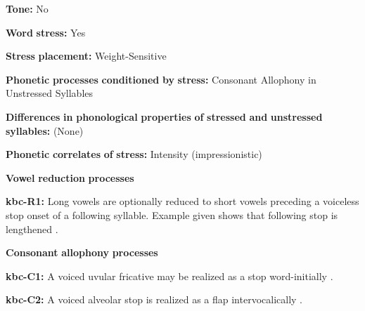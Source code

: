 \begin{styleBody}
\textbf{Tone:} No
\end{styleBody}

\begin{styleBody}
\textbf{Word} \textbf{stress:} Yes
\end{styleBody}

\begin{styleBody}
\textbf{Stress} \textbf{placement:} Weight-Sensitive
\end{styleBody}

\begin{styleBody}
\textbf{Phonetic} \textbf{processes} \textbf{conditioned} \textbf{by} \textbf{stress:} Consonant Allophony in Unstressed Syllables
\end{styleBody}

\begin{styleBody}
\textbf{Differences} \textbf{in} \textbf{phonological} \textbf{properties} \textbf{of} \textbf{stressed} \textbf{and} \textbf{unstressed} \textbf{syllables:} (None)
\end{styleBody}

\begin{styleBody}
\textbf{Phonetic} \textbf{correlates} \textbf{of} \textbf{stress:} Intensity (impressionistic)
\end{styleBody}

\begin{styleBody}
\textbf{Vowel} \textbf{reduction} \textbf{processes}
\end{styleBody}

\begin{styleBody}
\textbf{kbc-R1:} Long vowels are optionally reduced to short vowels preceding a voiceless stop onset of a following syllable. Example given shows that following stop is lengthened \citep[17]{Sandalo1997}.
\end{styleBody}

\begin{styleBody}
\textbf{Consonant} \textbf{allophony} \textbf{processes}
\end{styleBody}

\begin{styleBody}
\textbf{kbc-C1:} A voiced uvular fricative may be realized as a stop word-initially \citep[16]{Sandalo1997}.
\end{styleBody}

\begin{styleBody}
\textbf{kbc-C2:} A voiced alveolar stop is realized as a flap intervocalically \citep[16]{Sandalo1997}.
\end{styleBody}

